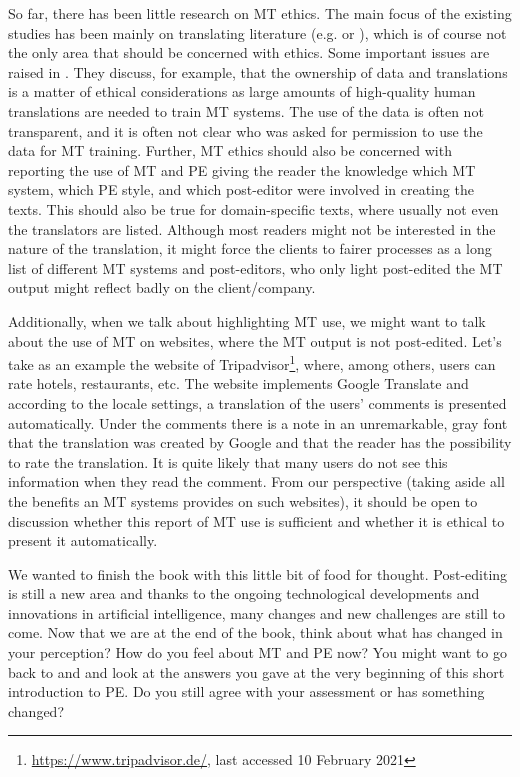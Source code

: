 So far, there has been little research on MT ethics. The main focus of the existing studies has been mainly on translating literature (e.g. \citealt{taivalkoski2019ethical} or \citealt{kenny2020machine}), which is of course not the only area that should be concerned with ethics. Some important issues are raised in \cite{moorkens2020ethics}. They discuss, for example, that the ownership of data and translations is a matter of ethical considerations as large amounts of high-quality human translations are needed to train MT systems. The use of the data is often not transparent, and it is often not clear who was asked for permission to use the data for MT training. Further, MT ethics should also be concerned with reporting the use of MT and PE giving the reader the knowledge which MT system, which PE style, and which post-editor were involved in creating the texts. This should also be true for domain-specific texts, where usually not even the translators are listed. Although most readers might not be interested in the nature of the translation, it might force the clients to fairer processes as a long list of different MT systems and post-editors, who only light post-edited the MT output might reflect badly on the client/company.

Additionally, when we talk about highlighting MT use, we might want to talk about the use of MT on websites, where the MT output is not post-edited. Let's take as an example the website of Tripadvisor\footnote{\url{https://www.tripadvisor.de/}, last accessed 10 February 2021}, where, among others, users can rate hotels, restaurants, etc. The website implements Google Translate and according to the locale settings, a translation of the users' comments is presented automatically. Under the comments there is a note in an unremarkable, gray font that the translation was created by Google and that the reader has the possibility to rate the translation. It is quite likely that many users do not see this information when they read the comment. From our perspective (taking aside all the benefits an MT systems provides on such websites), it should be open to discussion whether this report of MT use is sufficient and whether it is ethical to present it automatically.

We wanted to finish the book with this little bit of food for thought. Post-editing is still a new area and thanks to the ongoing technological developments and innovations in artificial intelligence, many changes and new challenges are still to come. Now that we are at the end of the book, think about what has changed in your perception? How do you feel about MT and PE now? You might want to go back to  and  and look at the answers you gave at the very beginning of this short introduction to PE. Do you still agree with your assessment or has something changed?

